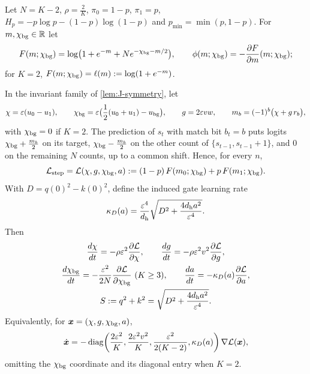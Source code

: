 Let $N=K-2$, $\rho=\frac{2}{K}$, $\pi_0=1-p$, $\pi_1=p$, $H_p=-p\log p-(1-p)\log(1-p)$ and $p_{\min}=\min(p,1-p)$. For $m,\chi_{\mathrm{bg}}\in\mathbb R$ let
\[
 F(m;\cbg)=\log\bigl(1+e^{-m}+N e^{-\cbg-m/2}\bigr),\qquad \phi(m;\cbg)=-\pd{F}{m}(m;\cbg);
\]
for $K=2$, $F(m;\chi_{\mathrm{bg}})=\ell(m):=\log(1+e^{-m})$.

\begin{lemma}
\label{lem:J-reduce}
In the invariant family of \cref{lem:J-symmetry}, let
\[
 \cnt=\initscale(u_0-u_1),\qquad \cbg=\initscale\bigl(\tfrac{1}{2}(u_0+u_1)-u_{\mathrm{bg}}\bigr),\qquad g=2\initscale vw,\qquad m_b=(-1)^b\bigl(\cnt+g\,r_b\bigr),
\]
with $\chi_{\mathrm{bg}}=0$ if $K=2$. The prediction of $s_t$ with match bit $b_t=b$ puts logits $\chi_{\mathrm{bg}}+\frac{m_b}{2}$ on its target, $\chi_{\mathrm{bg}}-\frac{m_b}{2}$ on the other count of
$\{s_{t-1},s_{t-1}+1\}$, and $0$ on the remaining $N$ counts, up to a common shift. Hence, for every $n$,
\[
 \mathcal L_{\mathrm{step}}=\mathcal L(\chi,g,\chi_{\mathrm{bg}},a):=(1-p)\,F(m_0;\chi_{\mathrm{bg}})+p\,F(m_1;\chi_{\mathrm{bg}}).
\]
With $D=q(0)^2-k(0)^2$, define the induced gate learning rate
\[
 \kappa_D(a)=\frac{\varepsilon^4}{d_{\mathrm h}}\sqrt{D^2+\frac{4d_{\mathrm h}a^2}{\varepsilon^4}}.
\]
Then
\begin{equation}
 \begin{gathered}
 \ddt{\cnt}=-\rho\initscale^2\pd{\mathcal L}{\cnt},\qquad \ddt{g}=-\rho\initscale^2v^2\pd{\mathcal L}{g},\\ \ddt{\cbg}=-\frac{\initscale^2}{2N}\pd{\mathcal L}{\cbg}\ (K\ge3),\qquad \ddt{a}=-\kappa_D(a)\pd{\mathcal L}{a},\\
 S:=q^2+k^2=\sqrt{D^2+\frac{4d_{\mathrm h}a^2}{\initscale^4}}.
 \end{gathered}
 \label{eq:J-flow}
\end{equation}
Equivalently, for $\bm x=(\chi,g,\chi_{\mathrm{bg}},a)$,
\[
 \dot{\bm x}=-\operatorname{diag}\!\left(
 \frac{2\varepsilon^2}{K},\frac{2\varepsilon^2v^2}{K},
 \frac{\varepsilon^2}{2(K-2)},\kappa_D(a)\right)\nabla\mathcal L(\bm x),
\]
omitting the $\chi_{\mathrm{bg}}$ coordinate and its diagonal entry when $K=2$.
\end{lemma}

